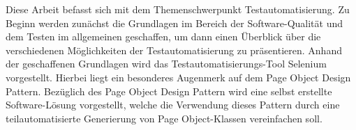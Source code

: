 \label{sec:zusammenfassung}
Diese Arbeit befasst sich mit dem Themenschwerpunkt Testautomatisierung.
Zu Beginn werden zunächst die Grundlagen im Bereich der Software-Qualität und dem Testen im allgemeinen geschaffen, um dann einen Überblick über die verschiedenen Möglichkeiten der Testautomatisierung zu präsentieren.
Anhand der geschaffenen Grundlagen wird das Testautomatisierungs-Tool Selenium vorgestellt. Hierbei liegt ein besonderes Augenmerk auf dem Page Object Design Pattern. Bezüglich des Page Object Design Pattern wird eine selbst erstellte Software-Lösung vorgestellt, welche die Verwendung dieses Pattern durch eine teilautomatisierte Generierung von Page Object-Klassen vereinfachen soll.